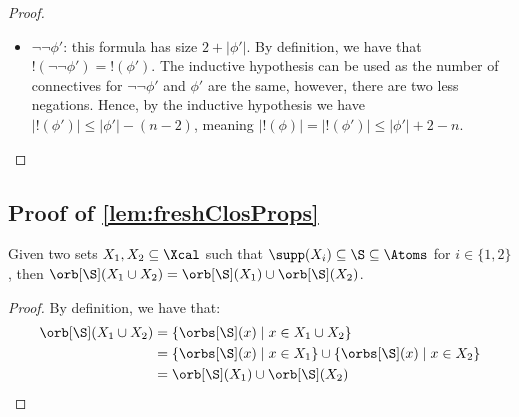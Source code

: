 \begin{proof}
\begin{itemize}
\begin{align*}
			&\le 2 + |\phi'| + |\vec u| - n
		\end{align*}
		A similar argument can be shown for $\lnot (\nu X(\vec x).\phi')(\vec u)$.
				\item $\lnot \lnot \phi'$: this formula has size $2 + |\phi'|$. 
		By definition, we have that $!(\lnot \lnot \phi') = !(\phi')$. 
		The inductive hypothesis can be used as the number of connectives for $\lnot \lnot \phi'$ and $\phi'$ are the same, however, there are two less negations. 
		Hence, by the inductive hypothesis we have $|!(\phi')| \le |\phi'| - (n - 2)$, 
		meaning $|!(\phi)| = |!(\phi')| \le |\phi'| + 2 - n $.
	\end{itemize}
\end{proof}

\subsection{Proof of  \cref{lem:freshClosProps}}

\begin{lemma}\label{lem:unionOrb2}
	Given two sets $X_1,X_2\subseteq \Xcal$ such that $\supp(X_i) \subseteq \S \subseteq \Atoms$ for $i \in \{1, 2\}$,
	then $\orb[\S](X_1 \cup X_2) = \orb[\S](X_1) \cup \orb[\S](X_2)$.
\end{lemma}

\begin{proof}
	By definition, we have that:
	\begin{align*}
		\orb[\S](X_1 \cup X_2) &= \{\orbs[\S](x) \mid x \in X_1 \cup X_2\} 
		\\ &= \{\orbs[\S](x) \mid x \in X_1\} \cup \{\orbs[\S](x) \mid x \in X_2\} 
		\\ &= \orb[\S](X_1) \cup \orb[\S](X_2)    
	\end{align*}
\end{proof}

